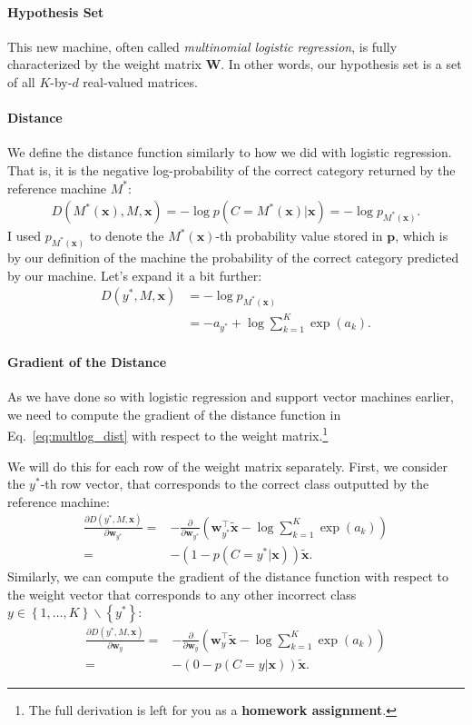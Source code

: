 \documentclass{report}
\newcommand{\vect}[1]{\mathbf{#1}}
\newcommand{\matr}[1]{\mathbf{#1}}
\newcommand{\vx}[0]{\vect{x}}
\newcommand{\vp}[0]{\vect{p}}
\newcommand{\vw}[0]{\vect{w}}
\newcommand{\mW}[0]{\matr{W}}
\begin{document}
\paragraph{Hypothesis Set} 

This new machine, often called {\it multinomial logistic regression}, is fully
characterized by the weight matrix $\mW$. In other words, our hypothesis set is
a set of all $K$-by-$d$ real-valued matrices. 

\paragraph{Distance} 
We define the distance function similarly to how we did with logistic
regression. That is, it is the negative log-probability of the correct category
returned by the reference machine $M^*$:
\begin{align}
    \label{eq:multlog_dist}
    D(M^*(\vx), M, \vx) = -\log p(C=M^*(\vx) | \vx) = -\log p_{M^*(\vx)}.
\end{align}
I used $p_{M^*(\vx)}$ to denote the $M^*(\vx)$-th probability value stored in
$\vp$, which is by our definition of the machine the probability of the correct
category predicted by our machine.  Let's expand it a bit further:
\begin{align*}
    D(y^*, M, \vx) &= -\log p_{M^*(\vx)} \\
                   &= -a_{y^*} + \log \sum_{k=1}^K \exp(a_k).
\end{align*}

\paragraph{Gradient of the Distance}

As we have done so with logistic regression and support vector machines earlier,
we need to compute the gradient of the distance function in
Eq.~\eqref{eq:multlog_dist} with respect to the weight matrix.\footnote{
    The full derivation is left for you as a {\bf homework assignment}.
}

We will do this
for each row of the weight matrix separately. First, we consider the $y^*$-th
row vector, that corresponds to the correct class outputted by the reference
machine: 
\begin{align*}
    \frac{\partial D(y^*, M, \vx)}{\partial \vw_{y^*}} =&
    -\frac{\partial}{\partial \vw_{y^*}} \left(
        \vw_{y^*}^\top \tilde{\vx} - \log \sum_{k=1}^K \exp(a_k)
    \right) \\
    =& -( 1 - p(C=y^* | \vx)) \tilde{\vx}.
\end{align*}
Similarly, we can compute the gradient of the distance function with respect to
the weight vector that corresponds to any other incorrect class $y \in \left\{1,
\ldots, K \right\} \backslash \left\{ y^* \right\}$:
\begin{align*}
    \frac{\partial D(y^*, M, \vx)}{\partial \vw_{y}} =&
    -\frac{\partial}{\partial \vw_{y}} \left(
        \vw_{y}^\top \tilde{\vx} - \log \sum_{k=1}^K \exp(a_k)
    \right) \\
    =& -( 0 - p(C=y | \vx)) \tilde{\vx}.
\end{align*}
\end{document}
